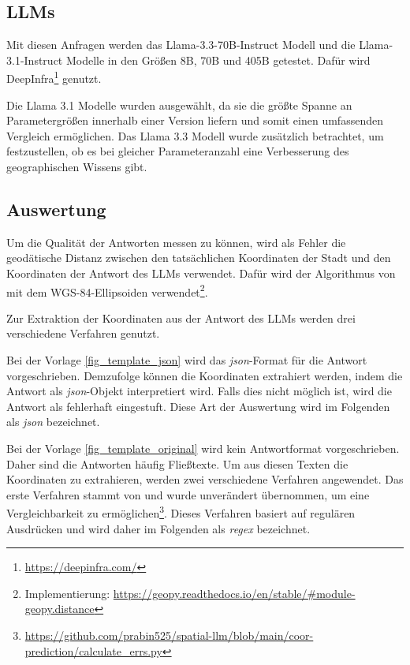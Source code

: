 \subsection{LLMs}
Mit diesen Anfragen werden das Llama-3.3-70B-Instruct Modell und die Llama-3.1-Instruct Modelle in den Größen 8B, 70B und 405B getestet.
Dafür wird DeepInfra\footnote{\url{https://deepinfra.com/}} genutzt.

Die Llama 3.1 Modelle wurden ausgewählt, da sie die größte Spanne an Parametergrößen innerhalb einer Version liefern und somit einen umfassenden Vergleich ermöglichen.
Das Llama 3.3 Modell wurde zusätzlich betrachtet, um festzustellen, ob es bei gleicher Parameteranzahl eine Verbesserung des geographischen Wissens gibt.

\subsection{Auswertung}
\label{ss:methods:coords:verfahren}
Um die Qualität der Antworten messen zu können, wird als Fehler die geodätische Distanz zwischen den tatsächlichen Koordinaten der Stadt und den Koordinaten der Antwort des LLMs verwendet.
Dafür wird der Algorithmus von \citet{karneyAlgorithmsGeodesics2013} mit dem WGS-84-Ellipsoiden verwendet\footnote{Implementierung: \url{https://geopy.readthedocs.io/en/stable/\#module-geopy.distance}}.

Zur Extraktion der Koordinaten aus der Antwort des LLMs werden drei verschiedene Verfahren genutzt.

Bei der Vorlage \ref{fig_template_json} wird das \textit{json}-Format für die Antwort vorgeschrieben. Demzufolge können die Koordinaten extrahiert werden, indem die Antwort als \textit{json}-Objekt interpretiert wird. Falls dies nicht möglich ist, wird die Antwort als fehlerhaft eingestuft. Diese Art der Auswertung wird im Folgenden als \textit{json} bezeichnet.

Bei der Vorlage \ref{fig_template_original} wird kein Antwortformat vorgeschrieben. Daher sind die Antworten häufig Fließtexte. Um aus diesen Texten die Koordinaten zu extrahieren, werden zwei verschiedene Verfahren angewendet. Das erste Verfahren stammt von \citet{bhandariAreLargeLanguage2023} und wurde unverändert übernommen, um eine Vergleichbarkeit zu ermöglichen\footnote{\url{https://github.com/prabin525/spatial-llm/blob/main/coor-prediction/calculate_errs.py}}. Dieses Verfahren basiert auf regulären Ausdrücken und wird daher im Folgenden als \textit{regex} bezeichnet.

